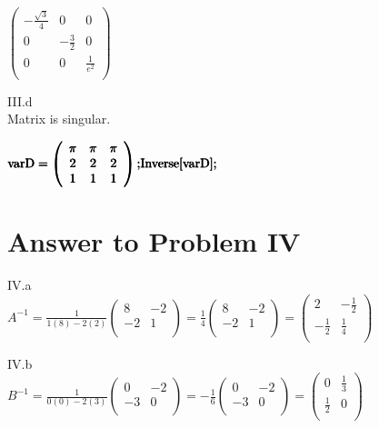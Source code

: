 \documentclass[11pt,a4paper]{article}
\begin{document}
\begin{doublespace}
\noindent\(\left(
\begin{array}{ccc}
 -\frac{\sqrt{3}}{4} & 0 & 0 \\
 0 & -\frac{3}{2} & 0 \\
 0 & 0 & \frac{1}{e^2} \\
\end{array}
\right)\)
\end{doublespace}

\clearpage
\hfill \break
III.d\\
Matrix is singular.

\begin{doublespace}
\noindent\(\pmb{\text{varD}=\left(
\begin{array}{ccc}
 \pi  & \pi  & \pi  \\
 2 & 2 & 2 \\
 1 & 1 & 1 \\
\end{array}
\right);}\\
\pmb{\text{Inverse}[\text{varD}];}\)
\end{doublespace}

\clearpage
\section{Answer to Problem IV}\label{sec:P04} %

IV.a\\
$
A^{-1}= \frac{1}{1(8)-2(2)}\left(
\begin{array}{cc}
 8 & -2 \\
 -2 & 1 \\
\end{array}
\right)= \frac{1}{4}\left(
\begin{array}{cc}
 8 & -2 \\
 -2 & 1 \\
\end{array}
\right)= \left(
\begin{array}{cc}
 2 & -\frac{1}{2} \\
 -\frac{1}{2} & \frac{1}{4} \\
\end{array}
\right)
$

\hfill \break
IV.b\\
$
B^{-1}= \frac{1}{0(0)-2(3)}\left(
\begin{array}{cc}
 0 & -2 \\
 -3 & 0 \\
\end{array}
\right)= -\frac{1}{6}\left(
\begin{array}{cc}
 0 & -2 \\
 -3 & 0 \\
\end{array}
\right)= \left(
\begin{array}{cc}
 0 & \frac{1}{3} \\
 \frac{1}{2} & 0 \\
\end{array}
\right)
$
\end{document}

